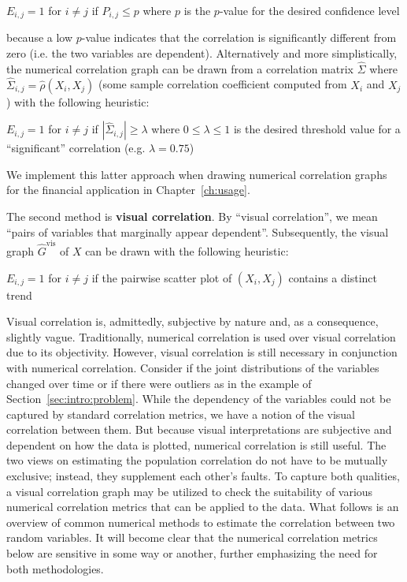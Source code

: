 \begin{algorithm}
	$E_{i,j} = 1$ for $i\neq j$ if $P_{i,j} \leq p$ where $p$ is the $p$-value 
	for the desired confidence level
\end{algorithm}

\noindent because a low $p$-value indicates that the correlation is 
significantly different from zero (i.e. the two variables are dependent). 
Alternatively and more simplistically, the numerical correlation graph can be 
drawn from a correlation matrix $\hat{\Sigma}$ where 
$\hat{\Sigma}_{i,j}=\hat{\rho}(X_i,X_j)$ (some sample correlation coefficient 
computed from $X_i$ and $X_j$) with the following heuristic:\\

\begin{algorithm}
	$E_{i,j} = 1$ for $i\neq j$ if $|\hat{\Sigma}_{i,j}| \geq \lambda$ where 
	$0 \leq \lambda \leq 1$ is the desired threshold value for a 
	``significant'' correlation (e.g. $\lambda = 0.75$)
\end{algorithm}

\noindent We implement this latter approach when drawing numerical correlation 
graphs for the financial application in Chapter~\ref{ch:usage}.

The second method is \textbf{visual correlation}. By ``visual correlation'', we 
mean ``pairs of variables that marginally appear dependent''. 
Subsequently, the visual graph $\hat{G}^{\text{vis}}$ of $X$ can be drawn with 
the following heuristic:\\

\begin{algorithm}
	$E_{i,j} = 1$ for $i\neq j$ if the pairwise scatter plot of $(X_i, X_j)$ 
	contains a distinct trend
\end{algorithm}

Visual correlation is, admittedly, subjective by nature 
and, as a consequence, slightly vague. Traditionally, 
numerical correlation is used over visual correlation due to its objectivity. 
However, visual correlation is still necessary in conjunction with 
numerical correlation. Consider if the joint distributions of the variables 
changed over time or if there were outliers as in the example of 
Section~\ref{sec:intro:problem}. While the dependency of the variables could 
not be captured by standard correlation metrics, we have a notion of the visual 
correlation between them. But because visual interpretations are subjective and 
dependent on how the data is plotted, numerical correlation is still useful. 
The two views on estimating the population correlation do not have to be 
mutually exclusive; instead, they supplement each other's faults.
To capture both qualities, a visual correlation graph may be utilized to check 
the suitability of various numerical correlation metrics that can be applied to 
the data.
What follows is an overview of common numerical methods 
to estimate the correlation between two random variables. It will become clear 
that the numerical correlation metrics below are sensitive in some way or 
another, further emphasizing the need for both methodologies.

